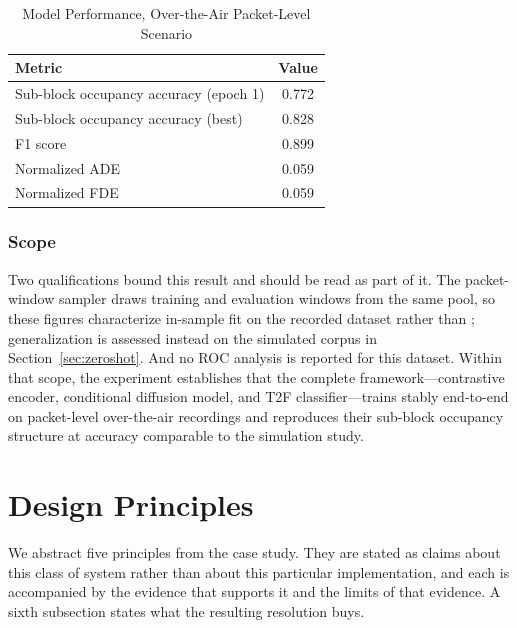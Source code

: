 \documentclass[lettersize,journal]{IEEEtran}
\begin{document}
\begin{table}[!t]
\centering
\caption{Model Performance, Over-the-Air Packet-Level Scenario}
\label{tab:ota}
\renewcommand{\arraystretch}{1.2}
\begin{tabular}{@{}lc@{}}
\toprule
\textbf{Metric} & \textbf{Value} \\
\midrule
Sub-block occupancy accuracy (epoch 1) & 0.772 \\
Sub-block occupancy accuracy (best)    & 0.828 \\
F1 score                               & 0.899 \\
Normalized ADE                         & 0.059 \\
Normalized FDE                         & 0.059 \\
\bottomrule
\end{tabular}
\end{table}

\subsubsection{\textbf{Scope}}
Two qualifications bound this result and should be read as part of it. The
packet-window sampler draws training and evaluation windows from the same pool,
so these figures characterize in-sample fit on the recorded dataset rather than
; generalization is assessed instead on the simulated
corpus in Section~\ref{sec:zeroshot}. And no ROC analysis is reported for this
dataset. Within that scope, the experiment establishes that the complete
framework---contrastive encoder, conditional diffusion model, and T2F
classifier---trains stably end-to-end on packet-level over-the-air recordings
and reproduces their sub-block occupancy structure at accuracy comparable to the
simulation study.

\section{\textbf{Design Principles}}

We abstract five principles from the case study. They are stated as
claims about this class of system rather than about this particular
implementation, and each is accompanied by the evidence that supports it
and the limits of that evidence. A sixth subsection states what the
resulting resolution buys.
\end{document}
